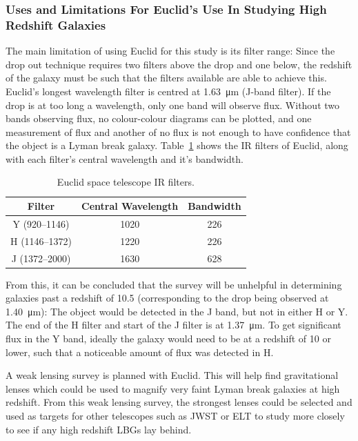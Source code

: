 	\subsubsection{Uses and Limitations For Euclid's Use In Studying High Redshift Galaxies} %
	\label{ssub:uses_and_limitations_for_euclid_s_use_in_studying_high_redshift_galaxies}
		The main limitation of using Euclid for this study is its filter range: Since the drop out technique requires two filters above the drop and one below, the redshift of the galaxy must be such that the filters available are able to achieve this. Euclid's longest wavelength filter is centred at \SI{1.63}{\micro\metre} (J-band filter). If the drop is at too long a wavelength, only one band will observe flux. Without two bands observing flux, no colour-colour diagrams can be plotted, and one measurement of flux and another of no flux is not enough to have confidence that the object is a Lyman break galaxy. Table~\ref{fig:euclid_ir_filters} shows the IR filters of Euclid, along with each filter's central wavelength and it's bandwidth.
		\begin{table}[!htbp]
			\centering
				\begin{tabular}{c|c|c}
					Filter & Central Wavelength & Bandwidth \\
					\hline\hline
					Y (920--1146) & 1020 & 226 \\
					H (1146--1372) & 1220 & 226 \\
					J (1372--2000) & 1630 & 628 \\
				\end{tabular}
				\caption{Euclid space telescope IR filters.\label{fig:euclid_ir_filters}}
		\end{table}

		From this, it can be concluded that the survey will be unhelpful in determining galaxies past a redshift of 10.5 (corresponding to the drop being observed at \SI{1.40}{\micro\metre}): The object would be detected in the J band, but not in either H or Y. The end of the H filter and start of the J filter is at \SI{1.37}{\micro\metre}. To get significant flux in the Y band, ideally the galaxy would need to be at a redshift of 10 or lower, such that a noticeable amount of flux was detected in H.

		A weak lensing survey is planned with Euclid. This will help find gravitational lenses which could be used to magnify very faint Lyman break galaxies at high redshift. From this weak lensing survey, the strongest lenses could be selected and used as targets for other telescopes such as JWST or ELT to study more closely to see if any high redshift LBGs lay behind.

